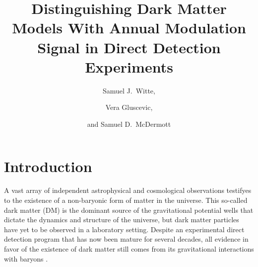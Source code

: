 \documentclass[11pt]{article}
\begin{document}
\title{Distinguishing Dark Matter Models With Annual Modulation Signal in Direct Detection Experiments}
\author[a,b]{Samuel J.~Witte,}
\author[c]{Vera Gluscevic,}
\author[d]{and Samuel D.~McDermott}






\abstract{


}

\maketitle

\section{Introduction} \setcounter{page}{2}

A vast array of independent astrophysical and cosmological observations testifyes to the existence of a non-baryonic form of matter in the universe. This so-called dark matter (DM) is the dominant source of the gravitational potential wells that dictate the dynamics and structure of the universe, but dark matter particles have yet to be observed in a laboratory setting. Despite an experimental direct detection program that has now been mature for several decades, all evidence in favor of the existence of dark matter still comes from its gravitational interactions with baryons \cite{Bauer:2013ihz}.
\end{document}
